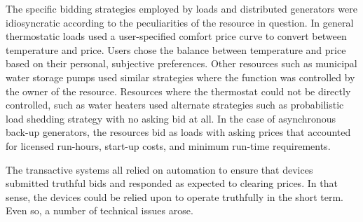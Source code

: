The specific bidding strategies employed by loads and distributed generators were idiosyncratic according to the peculiarities of the resource in question.  In general thermostatic loads used a user-specified comfort price curve to convert between temperature and price. Users chose the balance between temperature and price based on their personal, subjective preferences. Other resources such as municipal water storage pumps used similar strategies where the function was controlled by the owner of the resource. Resources where the thermostat could not be directly controlled, such as water heaters used alternate strategies such as probabilistic load shedding strategy with no asking bid at all.  In the case of asynchronous back-up generators, the resources bid as loads with asking prices that accounted for licensed run-hours, start-up costs, and minimum run-time requirements.

The transactive systems all relied on automation to ensure that devices submitted truthful bids and responded as expected to clearing prices.  In that sense, the devices could be relied upon to operate truthfully in the short term.  Even so, a number of technical issues arose.

